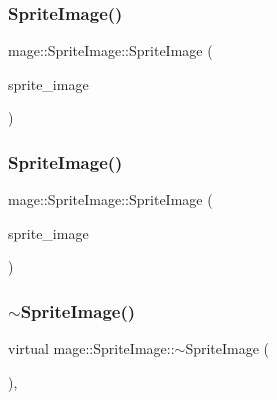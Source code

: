 \hypertarget{classmage_1_1_sprite_image_a7ce3b568dc3ff96e7467a8d00bba997d}{}\label{classmage_1_1_sprite_image_a7ce3b568dc3ff96e7467a8d00bba997d} 
\subsubsection{\texorpdfstring{Sprite\+Image()}{SpriteImage()}\hspace{0.1cm}{\footnotesize\ttfamily [5/6]}}
{\footnotesize\ttfamily mage\+::\+Sprite\+Image\+::\+Sprite\+Image (\begin{DoxyParamCaption}\item[{const \hyperlink{classmage_1_1_sprite_image}{Sprite\+Image} \&}]{sprite\+\_\+image }\end{DoxyParamCaption})}

\hypertarget{classmage_1_1_sprite_image_aa8e053469bd4032560c315e9f2a7c14b}{}\label{classmage_1_1_sprite_image_aa8e053469bd4032560c315e9f2a7c14b} 
\subsubsection{\texorpdfstring{Sprite\+Image()}{SpriteImage()}\hspace{0.1cm}{\footnotesize\ttfamily [6/6]}}
{\footnotesize\ttfamily mage\+::\+Sprite\+Image\+::\+Sprite\+Image (\begin{DoxyParamCaption}\item[{\hyperlink{classmage_1_1_sprite_image}{Sprite\+Image} \&\&}]{sprite\+\_\+image }\end{DoxyParamCaption})\hspace{0.3cm}{\ttfamily [default]}}

\hypertarget{classmage_1_1_sprite_image_ac5e53addd73b174c6b23d3f0d63260c1}{}\label{classmage_1_1_sprite_image_ac5e53addd73b174c6b23d3f0d63260c1} 
\subsubsection{\texorpdfstring{$\sim$\+Sprite\+Image()}{~SpriteImage()}}
{\footnotesize\ttfamily virtual mage\+::\+Sprite\+Image\+::$\sim$\+Sprite\+Image (\begin{DoxyParamCaption}{ }\end{DoxyParamCaption})\hspace{0.3cm}{\ttfamily [virtual]}, {\ttfamily [default]}}



